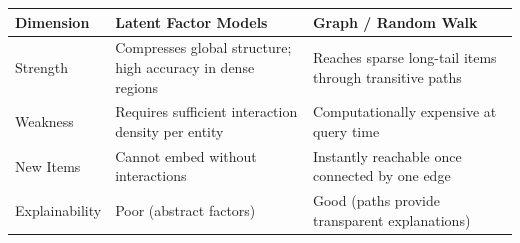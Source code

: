 \documentclass[12pt,a4paper]{article}
\begin{document}
\begin{center}
\renewcommand{\arraystretch}{1.4}
\begin{tabular}{|l|p{5.5cm}|p{6.5cm}|}
\hline
\textbf{Dimension} & \textbf{Latent Factor Models} & \textbf{Graph / Random Walk} \\
\hline
Strength & Compresses global structure; high accuracy in dense regions & Reaches sparse long-tail items through transitive paths \\
Weakness & Requires sufficient interaction density per entity & Computationally expensive at query time \\
New Items & Cannot embed without interactions & Instantly reachable once connected by one edge \\
Explainability & Poor (abstract factors) & Good (paths provide transparent explanations) \\
\hline
\end{tabular}
\end{center}
\end{document}
